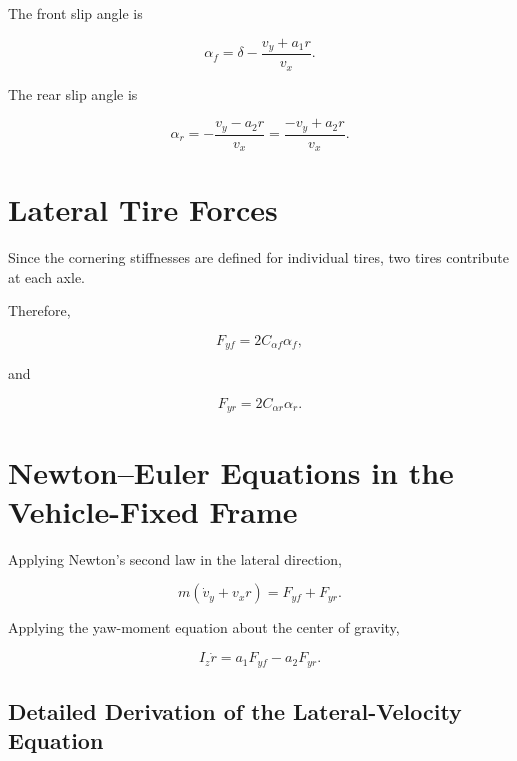 \documentclass[12pt,a4paper]{article}
\begin{document}
The front slip angle is

\begin{equation}
\boxed{
\alpha_f
=
\delta
-
\frac{v_y+a_1r}{v_x}
}.
\end{equation}

The rear slip angle is

\begin{equation}
\boxed{
\alpha_r
=
-\frac{v_y-a_2r}{v_x}
=
\frac{-v_y+a_2r}{v_x}
}.
\end{equation}

\section{Lateral Tire Forces}

Since the cornering stiffnesses are defined for individual tires, two
tires contribute at each axle.

Therefore,

\begin{equation}
\boxed{
F_{yf}=2C_{\alpha f}\alpha_f
},
\end{equation}

and

\begin{equation}
\boxed{
F_{yr}=2C_{\alpha r}\alpha_r
}.
\end{equation}

\section{Newton--Euler Equations in the Vehicle-Fixed Frame}

Applying Newton's second law in the lateral direction,

\begin{equation}
\boxed{
m\left(\dot v_y+v_xr\right)
=
F_{yf}+F_{yr}
}.
\end{equation}

Applying the yaw-moment equation about the center of gravity,

\begin{equation}
\boxed{
I_z\dot r
=
a_1F_{yf}-a_2F_{yr}
}.
\end{equation}

\subsection{Detailed Derivation of the Lateral-Velocity Equation}
\end{document}
